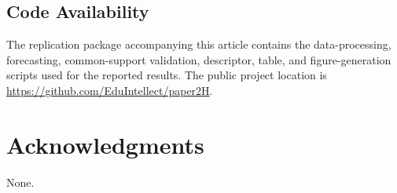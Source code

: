 \documentclass[pdflatex]{sn-jnl}
\begin{document}
\subsection*{Code Availability}
The replication package accompanying this article contains the data-processing,
forecasting, common-support validation, descriptor, table, and figure-generation
scripts used for the reported results. The public project location is
\url{https://github.com/EduIntellect/paper2H}.

\section*{Acknowledgments}
None.


\begingroup
{}


\endgroup
\end{document}
